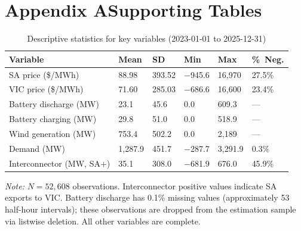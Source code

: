 \documentclass[12pt,a4paper]{article}
\begin{document}
\printbibliography

\clearpage
\appendix
\setcounter{table}{0}
\renewcommand{\thetable}{A\arabic{table}}
\setcounter{figure}{0}
\renewcommand{\thefigure}{A\arabic{figure}}

\section*{Appendix A\quad Supporting Tables}

\begin{table}[htbp]
  \centering
  \caption{Descriptive statistics for key variables (2023-01-01 to 2025-12-31)}
  \label{tab:desc}
  \begin{threeparttable}
    \begin{tabular}{lR{2.2cm}R{2.2cm}R{2.2cm}R{2.2cm}R{1.6cm}}
      \toprule
      Variable & Mean & SD & Min & Max & \%\ Neg. \\
      \midrule
      SA price (\$/MWh) & 88.98 & 393.52 & $-$945.6 & 16{,}970 & 27.5\% \\
      VIC price (\$/MWh) & 71.60 & 285.03 & $-$686.6 & 16{,}600 & 23.4\% \\
      Battery discharge (MW) & 23.1 & 45.6 & 0.0 & 609.3 & — \\
      Battery charging (MW) & 29.8 & 51.0 & 0.0 & 518.9 & — \\
      Wind generation (MW) & 753.4 & 502.2 & 0.0 & 2{,}189 & — \\
      Demand (MW) & 1{,}287.9 & 451.7 & $-$287.7 & 3{,}291.9 & 0.3\% \\
      Interconnector (MW, SA$+$) & 35.1 & 308.0 & $-$681.9 & 676.0 & 45.9\% \\
      \bottomrule
    \end{tabular}
    \begin{tablenotes}
      \small
      \item \textit{Note:} $N = 52{,}608$ observations.  Interconnector positive
        values indicate SA exports to VIC.  Battery discharge has 0.1\% missing
        values (approximately 53 half-hour intervals); these observations are
        dropped from the estimation sample via listwise deletion.
        All other variables are complete.
    \end{tablenotes}
  \end{threeparttable}
\end{table}
\end{document}
